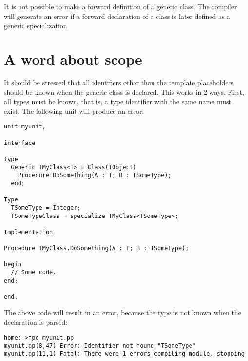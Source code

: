 \begin{remark}
It is not possible to make a forward definition of a generic class. The
compiler will generate an error if a forward declaration of a class is
later defined as a generic specialization.
\end{remark}

\section{A word about scope}
It should be stressed that all identifiers other than the template placeholders
should be known when the generic class is declared. This works in 2 ways.
First, all types must be known, that is, a type identifier with the same name
must exist. The following unit will produce an error:
\begin{verbatim}
unit myunit;

interface

type 
  Generic TMyClass<T> = Class(TObject)
    Procedure DoSomething(A : T; B : TSomeType);
  end;

Type
  TSomeType = Integer;
  TSomeTypeClass = specialize TMyClass<TSomeType>;

Implementation

Procedure TMyClass.DoSomething(A : T; B : TSomeType);

begin
  // Some code.
end;

end.
\end{verbatim}
The above code will result in an error, because the type  is
not known when the declaration is parsed:
\begin{verbatim}
home: >fpc myunit.pp
myunit.pp(8,47) Error: Identifier not found "TSomeType"
myunit.pp(11,1) Fatal: There were 1 errors compiling module, stopping
\end{verbatim}

